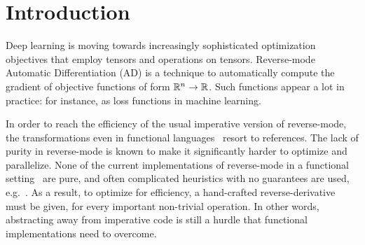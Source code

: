 \section{Introduction}
\label{sec:intro}



Deep learning is moving towards increasingly sophisticated optimization objectives that employ tensors and operations on tensors.
Reverse-mode Automatic Differentiation (AD) is a technique to automatically compute the gradient of objective functions of form $\mathbb{R}^n\to\mathbb{R}$.
Such functions appear a lot in practice: for instance, as loss functions in machine learning.


In order to reach the efficiency of the usual imperative version of reverse-mode, the transformations even in functional languages~\cite{pearlmutter2008reverse} resort to references.
The lack of purity in reverse-mode is known to make it significantly harder to optimize and parallelize. 
None of the current implementations of reverse-mode in a functional setting~\cite{lantern_icfp,pearlmutter2008reverse,baydin2016diffsharp} are pure, and often complicated heuristics with no guarantees are used, e.g.~\cite{xla}.
As a result, to optimize for efficiency, a hand-crafted reverse-derivative must be given, for every important non-trivial operation.
In other words, abstracting away from imperative code is still a hurdle that functional implementations need to overcome.

